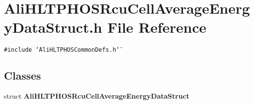 \section{Ali\-HLTPHOSRcu\-Cell\-Average\-Energy\-Data\-Struct.h File Reference}
\label{AliHLTPHOSRcuCellAverageEnergyDataStruct_8h}


{\tt \#include \char`\"{}Ali\-HLTPHOSCommon\-Defs.h\char`\"{}}\par
\subsection*{Classes}
\begin{CompactItemize}
\item 
struct {\bf Ali\-HLTPHOSRcu\-Cell\-Average\-Energy\-Data\-Struct}
\end{CompactItemize}
